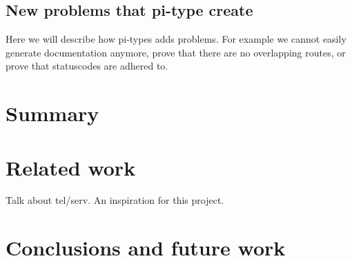 \documentclass[12pt,a4paper]{article}
\begin{document}
\subsection{New problems that pi-type create}
Here we will describe how pi-types adds problems. For example we cannot easily generate documentation anymore, prove that there are no overlapping routes, or prove that statuscodes are adhered to.

\section{Summary}
\section{Related work}
Talk about tel/serv. An inspiration for this project.
\section{Conclusions and future work}
\end{document}
